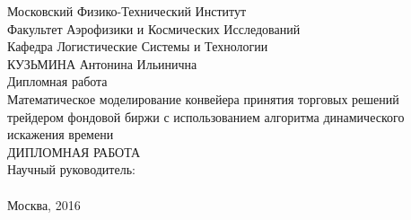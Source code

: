 \documentclass{article}
\begin{document}
Московский Физико-Технический Институт \\
Факультет Аэрофизики и Космических Исследований \\
Кафедра Логистические Системы и Технологии \\
КУЗЬМИНА Антонина Ильинична \\
Дипломная работа \\
Математическое моделирование конвейера принятия торговых решений трейдером фондовой биржи с использованием алгоритма динамического искажения времени \\
ДИПЛОМНАЯ РАБОТА \\
Научный руководитель: \\
\\
Москва, 2016
\newpage{}
\tableofcontents{}
\newpage{}
\end{document}
